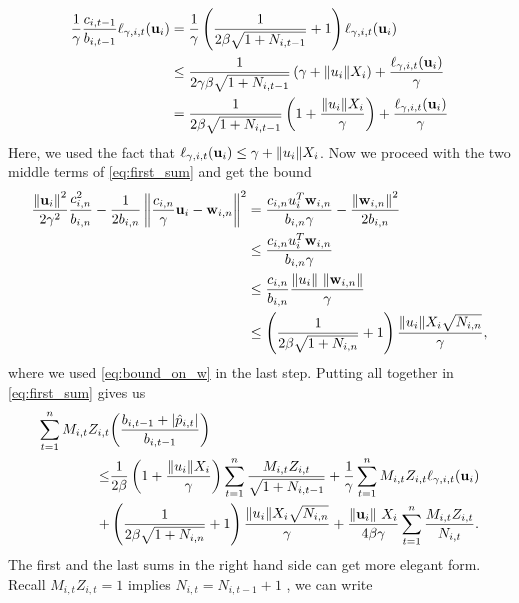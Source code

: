 \begin{equation*}
\begin{split}
\frac{1}{\gamma}\frac{c_{i,t-1}}{b_{i,t-1}}\ell_{\gamma,i,t}(\mathbf{u}_i)&=\frac{1}{\gamma}\left({\frac{1}{2\beta\sqrt{1+N_{i,t-1}}}+1}\right)\ell_{\gamma,i,t}(\mathbf{u}_i)\\
&\le \frac{1}{2\gamma\beta\sqrt{1+N_{i,t-1}}}\left({\gamma+\Vert u_i\Vert X_i}\right)+\frac{\ell_{\gamma,i,t}(\mathbf{u}_i)}{\gamma}\\
&=\frac{1}{2\beta\sqrt{1+N_{i,t-1}}}\left({1+\frac{\Vert u_i\Vert X_i}{\gamma}}\right)+\frac{\ell_{\gamma,i,t}(\mathbf{u}_i)}{\gamma}
\end{split}
\end{equation*}
Here, we used  the fact that $\ell_{\gamma,i,t}(\mathbf{u}_i)\le \gamma+\Vert u_i\Vert X_i$.
Now we proceed  with  the two middle terms of \eqref{eq:first_sum} and get the bound
\begin{equation*}
\begin{split}
\frac{\left\Vert {\mathbf{u}_i} \right\Vert^2}{2\gamma^2}\frac{c_{i,n}^2}{b_{i,n}}-\frac{1}{2b_{i,n}}\left\Vert {\frac{c_{i,n}}{\gamma} \mathbf{u}_i-\mathbf{w}_{i,n}} \right\Vert^2
&=\frac{c_{i,n}u_i^T\mathbf{w}_{i,n}}{b_{i,n}\gamma}-\frac{\left\Vert {\mathbf{w}_{i,n}} \right\Vert^2}{2b_{i,n}}\\
&\le \frac{c_{i,n}u_i^T\mathbf{w}_{i,n}}{b_{i,n}\gamma}\\
&\le\frac{c_{i,n}}{b_{i,n}}\frac{{\Vert u_i\Vert}~{\Vert\mathbf{w}_{i,n}\Vert}}{\gamma}\\
&\le\left({\frac{1}{2\beta\sqrt{1+N_{i,n}}}+1}\right)\frac{{\Vert u_i\Vert}X_i\sqrt{N_{i,n}}}{\gamma},
\end{split}
\end{equation*}
where we used \eqref{eq:bound_on_w} in the last step.
Putting all together in \eqref{eq:first_sum}  gives us
\begin{equation*}
\begin{split}
\sum_{t=1}^{n}M_{i,t}Z_{i,t}&{\left({\frac{b_{i,t-1} +\left\vert{\hat{p}_{i,t}}\right\vert}{b_{i,t-1}}}\right)}\\
\le &\frac{1}{2\beta}\left({1+\frac{\Vert u_i\Vert X_i}{\gamma}}\right)\sum_{t=1}^{n}{\frac{M_{i,t}Z_{i,t}}{\sqrt{1+N_{i,t-1}}}}
+\frac{1}{\gamma}\sum_{t=1}^{n}{M_{i,t}Z_{i,t}}\ell_{\gamma,i,t}(\mathbf{u}_i)\\
+&\left({\frac{1}{2\beta\sqrt{1+N_{i,n}}}+1}\right)\frac{{\Vert u_i\Vert}X_i\sqrt{N_{i,n}}}{\gamma}
+\frac{\Vert\mathbf{u}_i\Vert~ X_i}{4\beta\gamma}\sum_{t=1}^{n}{\frac{M_{i,t}Z_{i,t}}{N_{i,t}}}.
\end{split}
\end{equation*} 
The first and the last sums in the right hand side can get more elegant form. Recall $M_{i,t}Z_{i,t}=1$ implies $N_{i,t}=N_{i,t-1}+1$ , we can write  
